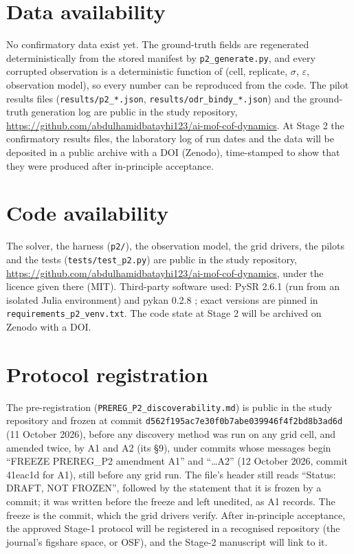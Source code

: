 \documentclass[11pt]{article}
\begin{document}
\section*{Data availability}
No confirmatory data exist yet. The ground-truth fields are regenerated deterministically
from the stored manifest by \texttt{p2\_generate.py}, and every corrupted observation is a
deterministic function of (cell, replicate, $\sigma$, $\varepsilon$, observation model),
so every number can be reproduced from the code. The pilot results files
(\texttt{results/p2\_*.json}, \texttt{results/odr\_bindy\_*.json}) and the ground-truth
generation log are public in the study repository,
\url{https://github.com/abdulhamidbatayhi123/ai-mof-cof-dynamics}. At Stage 2 the
confirmatory results files, the laboratory log of run dates and the data will be deposited
in a public archive with a DOI (Zenodo), time-stamped to show that they were produced
after in-principle acceptance.

\section*{Code availability}
\begin{sloppypar}
The solver, the harness (\texttt{p2/}), the observation model, the grid drivers, the
pilots and the tests (\texttt{tests/test\_p2.py}) are public in the study repository,
\url{https://github.com/abdulhamidbatayhi123/ai-mof-cof-dynamics}, under the licence
given there (MIT). Third-party software used: PySR 2.6.1 \citep{cranmer2023} (run from an
isolated Julia environment) and pykan 0.2.8 \citep{liu2024}; exact versions are pinned in
\texttt{requirements\_p2\_venv.txt}. The code state at Stage 2 will be archived on Zenodo
with a DOI.
\end{sloppypar}

\section*{Protocol registration}
The pre-registration (\texttt{PREREG\_P2\_discoverability.md}) is public in the study
repository and frozen at commit \texttt{d562f195ac7e30f0b7abe039946f4f2bd8b3ad6d}
(11 October 2026), before any discovery method was run on any grid cell, and amended twice,
by A1 and A2 (its \S9), under commits whose messages begin ``FREEZE PREREG\_P2 amendment
A1'' and ``\ldots A2'' (12 October 2026, commit 41eac1d for A1), still before any grid run. The file's header still reads
``Status: DRAFT, NOT FROZEN'', followed by the statement that it is frozen by a commit; it
was written before the freeze and left unedited, as A1 records. The freeze is the commit,
which the grid drivers verify. After in-principle
acceptance, the approved Stage-1 protocol will be registered in a recognised repository
(the journal's figshare space, or OSF), and the Stage-2 manuscript will link to it.
\end{document}
